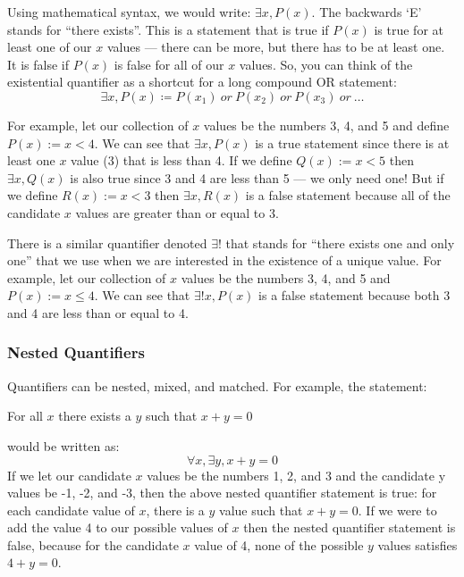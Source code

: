 \documentclass[letterpaper,12pt,fleqn]{article}
\begin{document}
Using mathematical syntax, we would write: $\exists x,P(x)$. The backwards `E'
stands for ``there exists''. This is a statement that is true if $P(x)$ is true
for at least one of our $x$ values --- there can be more, but there has to be
at least one. It is false if $P(x)$ is false for all of our $x$ values. So, you
can think of the existential quantifier as a shortcut for a long compound OR
statement:
\[\exists x,P(x)\coloneqq P(x_1)\ or\ P(x_2)\ or\ P(x_3)\ or\ \ldots\]

For example, let our collection of $x$ values be the numbers 3, 4, and 5 and
define $P(x):=x<4$. We can see that $\exists x,P(x)$ is a true statement since
there is at least one $x$ value (3) that is less than 4. If we define
$Q(x):=x<5$ then $\exists x,Q(x)$ is also true since 3 and 4 are less than 5
--- we only need one! But if we define $R(x):=x<3$ then $\exists x,R(x)$ is a
false statement because all of the candidate $x$ values are greater than or
equal to 3.

There is a similar quantifier denoted $\exists!$ that stands for ``there exists
one and only one'' that we use when we are interested in the existence of a
unique value. For example, let our collection of $x$ values be the numbers 3,
4, and 5 and $P(x):=x\le4$. We can see that $\exists! x,P(x)$ is a false
statement because both 3 and 4 are less than or equal to 4.

\subsubsection*{Nested Quantifiers}

Quantifiers can be nested, mixed, and matched. For example, the statement:

\hspace{0.5in}For all $x$ there exists a $y$ such that $x+y=0$

would be written as:
\[\forall x,\exists y,x+y=0\]
If we let our candidate $x$ values be the numbers 1, 2, and 3 and the
candidate y values be -1, -2, and -3, then the above nested quantifier
statement is true: for each candidate value of $x$, there is a $y$ value such
that $x+y=0$. If we were to add the value 4 to our possible values of $x$ then
the nested quantifier statement is false, because for the candidate $x$ value
of 4, none of the possible $y$ values satisfies $4+y=0$.
\end{document}
